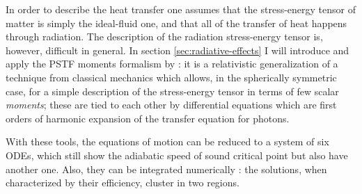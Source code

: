 \documentclass[main.tex]{subfiles}
\begin{document}
In order to describe the heat transfer one assumes that the stress-energy tensor of matter is simply the ideal-fluid one, and that all of the transfer of heat happens through radiation.
The description of the radiation stress-energy tensor is, however, difficult in general.
In section \ref{sec:radiative-effects} I will introduce and apply the PSTF moments formalism by \textcite[]{Thorne:1981feb}: it is a relativistic generalization of a technique from classical mechanics which allows, in the spherically symmetric case, for a simple description of the stress-energy tensor in terms of few scalar \emph{moments}; these are tied to each other by differential equations which are first orders of harmonic expansion of the transfer equation for photons.

With these tools, the equations of motion can be reduced to a system of six ODEs, which still show the adiabatic speed of sound critical point but also have another one.
Also, they can be integrated numerically \cite[]{NobiliTurollaZampieri:1991dec}: the solutions, when characterized by their efficiency, cluster in two regions.
\end{document}
